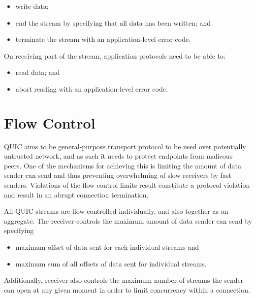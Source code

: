 \begin{itemize}

  \item write data;
  \item end the stream by specifying that all data has been written; and
  \item terminate the stream with an application-level error code.

\end{itemize}

On receiving part of the stream, application protocols need to be able to:

\begin{itemize}

  \item read data; and
  \item abort reading with an application-level error code.

\end{itemize}


\section{Flow Control}

QUIC aims to be general-purpose transport protocol to be used over potentially untrusted network,
and as such it needs to protect endpoints from malicous peers. One of the mechanisms for achieving
this is limiting the amount of data sender can send and thus preventing overwhelming of slow
receivers by fast senders. Violations of the flow control limits result constitute a protocol
violation and result in an abrupt connection termination.

All QUIC streams are flow controlled individually, and also together as an aggregate. The receiver
controls the maximum amount of data sender can send by specifying

\begin{itemize}
  \item maximum offset of data sent for each individual streams and
  \item maximum sum of all offsets of data sent for individual streams.
\end{itemize}

Additionally, receiver also controls the maximum number of streams the sender can open at any given
moment in order to limit concurrency within a connection.

